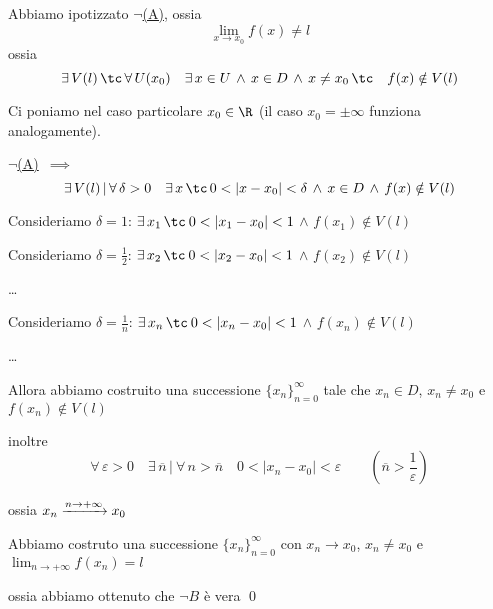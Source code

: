 {\begin{itemize}
        Abbiamo ipotizzato $\neg$\hyperref[vi:A]{(A)}, ossia \[
            \lim_{x\to x_0} f(x) \neq l
        \] ossia \[
            \exists\, V(l)\,\tc\, \forall\, U(x_0)\quad \exists\, x \in U \,\land\, x \in D\,\land\, x \neq x_0\,\tc\quad f(x)\notin V(l)
        \]

        Ci poniamo nel caso particolare $ x_0 \in \R $ (il caso $ x_0=\pm \infty $ funziona analogamente).
        
        $\neg$\hyperref[vi:A]{(A)} $ \,\implies\,  $
        \[
            \exists\, V(l)\,|\, \forall\, \delta >0\quad \exists\, x\,\tc\, 0<|x-x_0|<\delta \,\land\, x \in D \,\land\, f(x)\notin V(l)
        \]

        Consideriamo $\delta=1$: $ \exists\, x_{1}\,\tc\: 0<|x_1-x_{0} |<1 $ $\land$ $ f(x_1) \notin V(l) $
        
        Consideriamo $ \delta=\frac{1}{2} $: $ \exists\, x_{2}\,\tc\: 0<|x_{2} -x_{0} |<1 $ $\land$ $ f(x_2) \notin V(l) $

        \dots

        Consideriamo $ \delta=\frac{1}{n} $: $ \exists\, x_{n}\,\tc\: 0<|x_{n} -x_{0} |<1 $ $\land$ $ f(x_n) \notin V(l) $

        \dots

        Allora abbiamo costruito una successione $ \{x_{n} \}_{n=0}^\infty $ tale che $ x_{n} \in D $, $ x_{n}\neq x_0  $ e $ f(x_{n})\notin V(l) $ 

        inoltre 
            \[
                \forall\, \varepsilon >0 \quad\exists\, \overline{n} \,|\: \forall\, n>\overline{n}\quad 0<|x_{n}-x_{0}|<\varepsilon \qquad\left(\overline{n}>\frac{1}{\varepsilon}\right)
            \]

        ossia $ x_{n} \xrightarrow{n\to + \infty} x_{0}  \displaystyle  $

        Abbiamo costruto una successione $ \{x_{n} \}_{n=0}^\infty $ con $ x_{n}\to x_0  $, $ x_{n} \neq x_0 $ e $ \lim_{n\to + \infty} f(x_{n} ) =l $ 

        ossia abbiamo ottenuto che $ \neg B $ è vera \qed
    \end{itemize}
}

